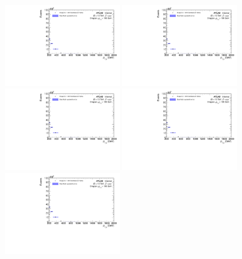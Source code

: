 \begin{figure}[h!]
  \centering
  \includegraphics[page=348,width=0.45\textwidth]{figures/unfoldErrPlots.pdf}
  \includegraphics[page=544,width=0.45\textwidth]{figures/unfoldErrPlots.pdf} \\
  \includegraphics[page=376,width=0.45\textwidth]{figures/unfoldErrPlots.pdf}
  \includegraphics[page=572,width=0.45\textwidth]{figures/unfoldErrPlots.pdf} \\
  \includegraphics[page=404,width=0.45\textwidth]{figures/unfoldErrPlots.pdf}

\end{figure}
